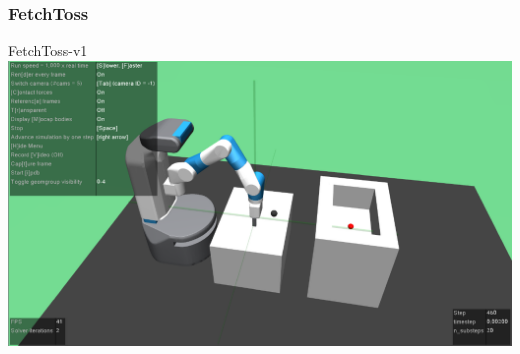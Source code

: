 






\begin{frame}
	\frametitle{FetchToss}	
	\vspace{1cm}
	
	FetchToss-v1
	\includegraphics[width=\textwidth, height=.55\textheight]{./Ressourcen/Figures/FetchToss-v1.pdf}
	
\end{frame}
\clearpage








